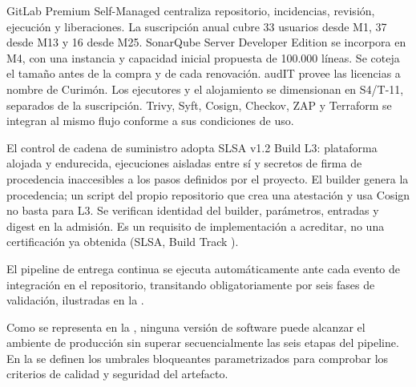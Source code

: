 GitLab Premium Self-Managed centraliza repositorio, incidencias, revisión, ejecución y liberaciones. La suscripción anual cubre 33 usuarios desde M1, 37 desde M13 y 16 desde M25. SonarQube Server Developer Edition se incorpora en M4, con una instancia y capacidad inicial propuesta de 100.000 líneas. Se coteja el tamaño antes de la compra y de cada renovación. audIT provee las licencias a nombre de Curimón. Los ejecutores y el alojamiento se dimensionan en S4/T-11, separados de la suscripción. Trivy, Syft, Cosign, Checkov, ZAP y Terraform se integran al mismo flujo conforme a sus condiciones de uso.


El control de cadena de suministro adopta SLSA v1.2 Build L3: plataforma alojada y endurecida, ejecuciones aisladas entre sí y secretos de firma de procedencia inaccesibles a los pasos definidos por el proyecto. El builder genera la procedencia; un script del propio repositorio que crea una atestación y usa Cosign no basta para L3. Se verifican identidad del builder, parámetros, entradas y digest en la admisión. Es un requisito de implementación a acreditar, no una certificación ya obtenida (SLSA, Build Track \parencite{d3_slsa12}).

El pipeline de entrega continua se ejecuta automáticamente ante cada evento de integración en el repositorio, transitando obligatoriamente por seis fases de validación, ilustradas en la .


Como se representa en la , ninguna versión de software puede alcanzar el ambiente de producción sin superar secuencialmente las seis etapas del pipeline. En la  se definen los umbrales bloqueantes parametrizados para comprobar los criterios de calidad y seguridad del artefacto.

